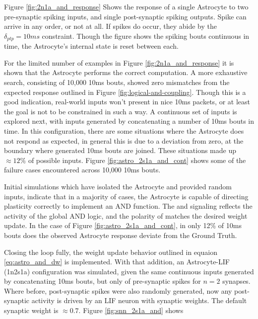 Figure \ref{fig:2n1a_and_response} Shows the response of a single Astrocyte to
two pre-synaptic spiking inputs, and single post-synaptic spiking outputs. Spike
can arrive in any order, or not at all. If spikes do occur, they abide by the
$\delta_{ptp}=10ms$ constraint. Though the figure shows the spiking bouts
continuous in time, the Astrocyte's internal state is reset between each.


For the limited number of examples in Figure \ref{fig:2n1a_and_response} it is
shown that the Astrocyte performs the correct computation. A more exhaustive
search, consisting of 10,000 10ms bouts, showed zero mismatches from the expected
response outlined in Figure \ref{fig:logical-and-coupling}. Though this is a
good indication, real-world inputs won't present in 
nice 10ms packets, or at least the goal is not to be constrained in such a
way. A continuous set of inputs is explored next, with inputs generated by
concatenating a number of 10ms bouts in time. In this configuration, there are
some situations where the Astrocyte does not respond as expected, in general
this is due to a \ca deviation from zero, at the boundary where generated 10ms
bouts are joined. These situations made up $\approx 12\%$ of possible inputs. Figure
\ref{fig:astro_2s1a_and_cont} shows some of the failure cases encountered across
10,000 10ms bouts.


Initial simulations which have isolated the Astrocyte and provided random
inputs, indicate that in a majority of cases, the Astrocyte is capable of
directing plasticity correctly to implement an AND function. The
\dser and \serca signaling reflects the activity of the global AND logic, and
the polarity of \dser matches the desired weight update. In the case of Figure
\ref{fig:astro_2s1a_and_cont}, in only 12\% of 10ms bouts does the observed
Astrocyte response deviate from the Ground Truth.

Closing the loop fully, the weight update behavior outlined in equaion
\ref{eq:astro_and_dw} is implemented. With that addition, an Astrocyte-LIF (1n2s1a)
configuration was simulated, given the same continuous inputs generated by
concatenating 10ms bouts, but only of pre-synaptic spikes for $n=2$
synapses. Where before, post-synaptic spikes were also randomly generated, now
any post-synaptic activity is driven by an LIF neuron with synaptic weights.
The default synaptic weight is $\approx 0.7$. Figure \ref{fig:snn_2s1a_and}
shows

